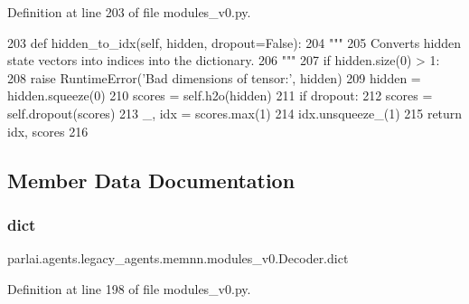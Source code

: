 Definition at line 203 of file modules\+\_\+v0.\+py.


\begin{DoxyCode}
203     \textcolor{keyword}{def }hidden\_to\_idx(self, hidden, dropout=False):
204         \textcolor{stringliteral}{"""}
205 \textcolor{stringliteral}{        Converts hidden state vectors into indices into the dictionary.}
206 \textcolor{stringliteral}{        """}
207         \textcolor{keywordflow}{if} hidden.size(0) > 1:
208             \textcolor{keywordflow}{raise} RuntimeError(\textcolor{stringliteral}{'Bad dimensions of tensor:'}, hidden)
209         hidden = hidden.squeeze(0)
210         scores = self.h2o(hidden)
211         \textcolor{keywordflow}{if} dropout:
212             scores = self.dropout(scores)
213         \_, idx = scores.max(1)
214         idx.unsqueeze\_(1)
215         \textcolor{keywordflow}{return} idx, scores
216 
\end{DoxyCode}


\subsection{Member Data Documentation}
\mbox{\label{classparlai_1_1agents_1_1legacy__agents_1_1memnn_1_1modules__v0_1_1Decoder_a612b3cfacbcdef8db8a7c6adc45e6695}} 
\subsubsection{\texorpdfstring{dict}{dict}}
{\footnotesize\ttfamily parlai.\+agents.\+legacy\+\_\+agents.\+memnn.\+modules\+\_\+v0.\+Decoder.\+dict}



Definition at line 198 of file modules\+\_\+v0.\+py.

\mbox{\label{classparlai_1_1agents_1_1legacy__agents_1_1memnn_1_1modules__v0_1_1Decoder_a0116a3c2b822fd074e7f67efc3609b69}} 

